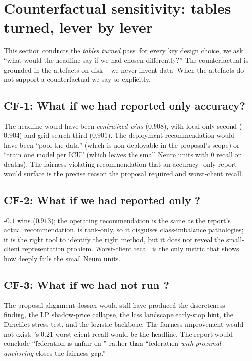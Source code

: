 \section{Counterfactual sensitivity: tables turned, lever by lever}
\label{sec:counterfactuals}

This section conducts the \emph{tables turned} pass: for every key
design choice, we ask ``what would the headline say if we had
chosen differently?'' The counterfactual is grounded in the
artefacts on disk -- we never invent data. When the artefacts do not
support a counterfactual we say so explicitly.

\subsection{CF-1: What if we had reported only accuracy?}
The headline would have been \emph{centralized wins} ($0.908$), with
local-only second ($0.904$) and grid-search third ($0.901$). The
deployment recommendation would have been ``pool the data'' (which
is non-deployable in the proposal's scope) or ``train one model per
ICU'' (which leaves the small Neuro units with $0$ recall on
deaths). The fairness-violating recommendation that an accuracy-
only report would surface is the precise reason the proposal
required \auprc{} and worst-client recall.

\subsection{CF-2: What if we had reported only \auroc{}?}
\fedprox{}-$0.1$ wins ($0.913$); the operating recommendation is the
same as the report's actual recommendation. \auroc{} is rank-only,
so it disguises class-imbalance pathologies; it is the right tool to
identify the right method, but it does not reveal the small-client
representation problem. Worst-client recall is the only metric that
shows how deeply \fedavg{} fails the small Neuro units.

\subsection{CF-3: What if we had not run \fedprox{}?}
The proposal-alignment dossier would still have produced the
\cvar{} discreteness finding, the LP shadow-price collapse, the
loss landscape early-stop hint, the Dirichlet stress test, and the
logistic backbone. The fairness improvement would not exist:
\fedavg{}'s $0.21$ worst-client recall would be the headline. The
report would conclude ``federation is unfair on \mimic{}'' rather
than ``federation \emph{with proximal anchoring} closes the
fairness gap.''

